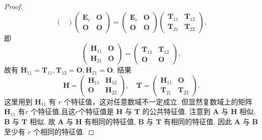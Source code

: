 \documentclass[../../main.tex]{subfiles}%
\begin{document}
\begin{proof}
\[\begin{pmatrix}
\end{pmatrix} \begin{pmatrix} 
\boldsymbol{E}_r & \boldsymbol{O} \\
\boldsymbol{O} & \boldsymbol{O} 
\end{pmatrix} = \begin{pmatrix} 
\boldsymbol{E}_r & \boldsymbol{O} \\
\boldsymbol{O} & \boldsymbol{O} 
\end{pmatrix} \begin{pmatrix} 
\boldsymbol{T}_{11} & \boldsymbol{T}_{12} \\
\boldsymbol{T}_{21} & \boldsymbol{T}_{22} 
\end{pmatrix},
\]
即
\[
\begin{pmatrix} 
\boldsymbol{H}_{11} & \boldsymbol{O} \\
\boldsymbol{H}_{21} & \boldsymbol{O} 
\end{pmatrix} = \begin{pmatrix} 
\boldsymbol{T}_{11} & \boldsymbol{T}_{12} \\
\boldsymbol{O} & \boldsymbol{O} 
\end{pmatrix},
\]
故有 $\boldsymbol{H}_{11} = \boldsymbol{T}_{11}, \boldsymbol{T}_{12} = \boldsymbol{O}, \boldsymbol{H}_{21} = \boldsymbol{O}$. 结果
\[
\boldsymbol{H} = \begin{pmatrix} 
\boldsymbol{H}_{11} & \boldsymbol{H}_{12} \\
\boldsymbol{O} & \boldsymbol{H}_{22} 
\end{pmatrix}, \quad \boldsymbol{T} = \begin{pmatrix} 
\boldsymbol{H}_{11} & \boldsymbol{O} \\
\boldsymbol{T}_{21} & \boldsymbol{T}_{22} 
\end{pmatrix}.
\]
这里用到 $\boldsymbol{H}_{11}$ 有 $r$ 个特征值，这对任意数域不一定成立. 但显然复数域上的矩阵 $\boldsymbol{H}_{11}$ 有$r$ 个特征值,且这$r$个特征值是 $\boldsymbol{H}$ 与 $\boldsymbol{T}$ 的公共特征值. 注意到 $\boldsymbol{A}$ 与 $\boldsymbol{H}$ 相似, $\boldsymbol{B}$ 与 $\boldsymbol{T}$ 相似. 故 $\boldsymbol{A}$ 与 $\boldsymbol{H}$ 有相同的特征值, $\boldsymbol{B}$ 与 $\boldsymbol{T}$ 有相同的特征值. 因此 $\boldsymbol{A}$ 与 $\boldsymbol{B}$ 至少有 $r$ 个相同的特征值.

\end{proof}
\end{document}
